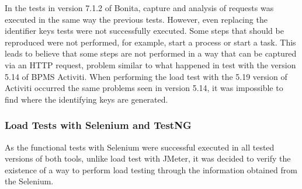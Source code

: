 \documentclass[runningheads,a4paper]{llncs}
\begin{document}
In the tests in version 7.1.2 of Bonita, capture and analysis of requests was executed in the same way the previous tests. However, even replacing the identifier keys tests were not successfully executed. Some steps that should be reproduced were not performed, for example, start a process or start a task. This leads to believe that some steps are not performed in a way that can be captured via an HTTP request, problem similar to what happened in test with the version 5.14 of BPMS Activiti. When performing the load test with the 5.19 version of Activiti occurred the same problems seen in version 5.14, it was impossible to find where the identifying keys are generated.


\subsubsection{Load Tests with Selenium and TestNG}
As the functional tests with Selenium were successful executed in all tested versions of both tools, 
unlike load test with JMeter, it was decided to verify the existence of a way to perform load testing through the information obtained from the Selenium. 
\end{document}
